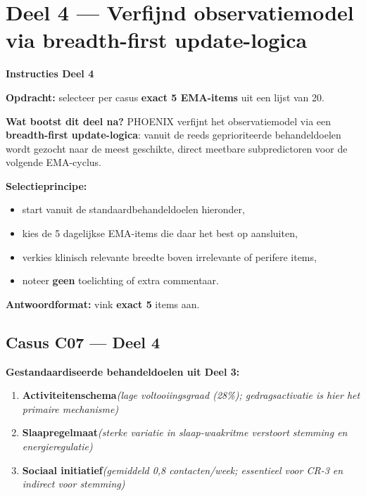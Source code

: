 \documentclass[11pt,a4paper]{article}
\begin{document}
\vspace{0.6em}
\newpage


\section{Deel 4 --- Verfijnd observatiemodel via breadth-first update-logica}

\begin{tcolorbox}[colback=purple!4,colframe=RichPurple,arc=2.5mm,boxrule=0.9pt,
  left=10pt,right=10pt,top=9pt,bottom=9pt]
\textbf{\color{RichPurple}Instructies Deel 4}

\smallskip\small
\textbf{Opdracht:} selecteer per casus \textbf{exact 5 EMA-items} uit een lijst van 20.

\textbf{Wat bootst dit deel na?}
PHOENIX verfijnt het observatiemodel via een \textbf{breadth-first update-logica}: vanuit de
reeds geprioriteerde behandeldoelen wordt gezocht naar de meest geschikte, direct meetbare
subpredictoren voor de volgende EMA-cyclus.

\textbf{Selectieprincipe:}
\begin{itemize}[topsep=2pt,itemsep=1pt]
\item start vanuit de standaardbehandeldoelen hieronder,
\item kies de 5 dagelijkse EMA-items die daar het best op aansluiten,
\item verkies klinisch relevante breedte boven irrelevante of perifere items,
\item noteer \textbf{geen} toelichting of extra commentaar.
\end{itemize}

\textbf{Antwoordformat:} vink \textbf{exact 5} items aan.
\end{tcolorbox}

\vspace{0.5em}
\subsection*{Casus C07 --- Deel 4}

\begin{contextbox}
\small\textbf{Gestandaardiseerde behandeldoelen uit Deel 3:}
\begin{enumerate}[topsep=2pt,itemsep=1pt,label=\arabic*.]
\item \textbf{Activiteitenschema}\quad\textit{\small (lage voltooiingsgraad (28\%); gedragsactivatie is hier het primaire mechanisme)}
\item \textbf{Slaapregelmaat}\quad\textit{\small (sterke variatie in slaap-waakritme verstoort stemming en energieregulatie)}
\item \textbf{Sociaal initiatief}\quad\textit{\small (gemiddeld 0,8 contacten/week; essentieel voor CR-3 en indirect voor stemming)}
\end{enumerate}
\end{contextbox}
\end{document}

